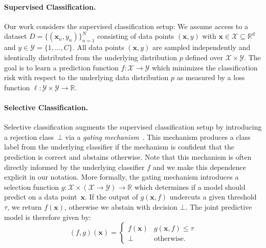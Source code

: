 
\paragraph{Supervised Classification.} Our work considers the supervised classification setup: We assume access to a dataset $D = \{(\bm{x}_n,y_n)\}_{n=1}^{N}$ consisting of data points $(\bm{x},y)$ with $\bm{x} \in \mathcal{X} \subseteq \mathbb{R}^d$ and $y \in \mathcal{Y} = \{1, \ldots, C\}$. All data points $(\bm{x},y)$ are sampled independently and identically distributed from the underlying distribution $p$ defined over $\mathcal{X} \times \mathcal{Y}$. The goal is to learn a prediction function $f : \mathcal{X} \rightarrow \mathcal{Y}$ which minimizes the classification risk with respect to the underlying data distribution $p$ as measured by a loss function $\ell : \mathcal{Y} \times \mathcal{Y} \rightarrow \mathbb{R}$. 

\paragraph{Selective Classification.} Selective classification augments the supervised classification setup by introducing a rejection class~$\bot$ via a \textit{gating mechanism}~\citep{yaniv2010riskcoveragecurve}. This mechanism produces a class label from the underlying classifier if the mechanism is confident that the prediction is correct and abstains otherwise. Note that this mechanism is often directly informed by the underlying classifier $f$ and we make this dependence explicit in our notation. More formally, the gating mechanism introduces a selection function $g:\mathcal{X} \times (\mathcal{X} \rightarrow \mathcal{Y}) \rightarrow \mathbb{R}$ which determines if a model should predict on a data point~$\bm{x}$. If the output of $g(\bm{x}, f)$ undercuts a given threshold $\tau$, we return $f(\bm{x})$, otherwise we abstain with decision $\bot$. The joint predictive model is therefore given by:
\begin{equation}
    (f,g)(\bm{x}) = \begin{cases}
  f(\bm{x})  & g(\bm{x}, f) \leq \tau \\
  \bot & \text{otherwise.}
\end{cases}
\end{equation}
